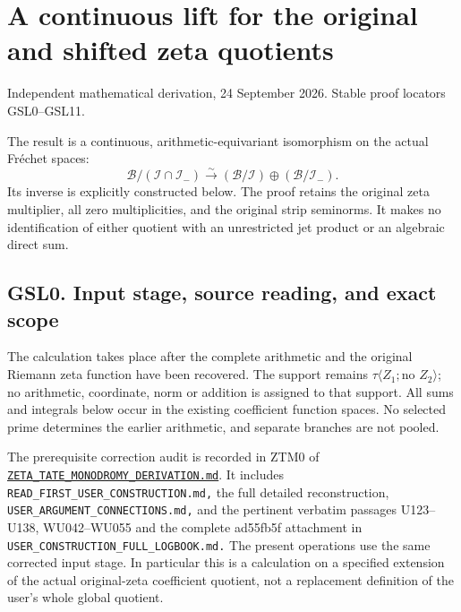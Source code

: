 \section{A continuous lift for the original and shifted zeta
quotients}\label{a-continuous-lift-for-the-original-and-shifted-zeta-quotients}

Independent mathematical derivation, 24 September 2026. Stable proof
locators GSL0--GSL11.

The result is a continuous, arithmetic-equivariant isomorphism on the
actual Fréchet spaces: \[
\mathcal B/(\mathcal I\cap\mathcal I_-)
 \xrightarrow{\sim}
(\mathcal B/\mathcal I)\oplus(\mathcal B/\mathcal I_-).
\tag{GSL0.1}
\] Its inverse is explicitly constructed below. The proof retains the
original zeta multiplier, all zero multiplicities, and the original
strip seminorms. It makes no identification of either quotient with an
unrestricted jet product or an algebraic direct sum.

\subsection{GSL0. Input stage, source reading, and exact
scope}\label{gsl0.-input-stage-source-reading-and-exact-scope}

The calculation takes place after the complete arithmetic and the
original Riemann zeta function have been recovered. The support remains
\(\tau\langle Z_1;\text{no }Z_2\rangle\); no arithmetic, coordinate,
norm or addition is assigned to that support. All sums and integrals
below occur in the existing coefficient function spaces. No selected
prime determines the earlier arithmetic, and separate branches are not
pooled.

The prerequisite correction audit is recorded in ZTM0 of
\href{https://github.com/KokunoYumeto/zeta-function-research-reader/blob/96b02efaf4511d07f33de5ea4cfb10058e905d7e/workbenches/splitzero-tandem/continuations/20260924-cohomology-weight-and-character-lifts/gct-weight-control/proofs/ZETA_TATE_MONODROMY_DERIVATION.md}{\nolinkurl{ZETA_TATE_MONODROMY_DERIVATION.md}}.
It includes \nolinkurl{READ_FIRST_USER_CONSTRUCTION.md,} the full
detailed reconstruction, \nolinkurl{USER_ARGUMENT_CONNECTIONS.md,} and
the pertinent verbatim passages U123--U138, WU042--WU055 and the
complete ad55fb5f attachment in
\nolinkurl{USER_CONSTRUCTION_FULL_LOGBOOK.md.} The present operations
use the same corrected input stage. In particular this is a calculation
on a specified extension of the actual original-zeta coefficient
quotient, not a replacement definition of the user's whole global
quotient.

